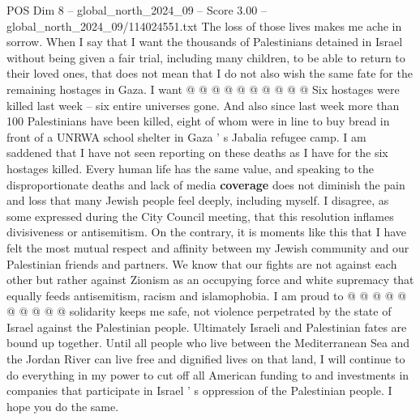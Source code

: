 \begin{textsample}{POS Dim 8 – global\_north\_2024\_09 – Score 3.00 – global\_north\_2024\_09/114024551.txt}
The loss of those lives makes me ache in sorrow.
When I say that I want the thousands of Palestinians detained in Israel without being given a fair trial, including many children, to be able to return to their loved ones, that does not mean that I do not also wish the same fate for the remaining hostages in Gaza.
I want @ @ @ @ @ @ @ @ @ @ Six hostages were killed last week -- six entire universes gone.
And also since last week more than 100 Palestinians have been killed, eight of whom were in line to buy bread in front of a UNRWA school shelter in Gaza ' s Jabalia refugee camp.
I am saddened that I have not seen reporting on these deaths as I have for the six hostages killed.
Every human life has the same value, and speaking to the disproportionate deaths and lack of media \textbf{coverage} does not diminish the pain and loss that many Jewish people feel deeply, including myself.
I disagree, as some expressed during the City Council meeting, that this resolution inflames divisiveness or antisemitism.
On the contrary, it is moments like this that I have felt the most mutual respect and affinity between my Jewish community and our Palestinian friends and partners.
We know that our fights are not against each other but rather against Zionism as an occupying force and white supremacy that equally feeds antisemitism, racism and islamophobia.
I am proud to @ @ @ @ @ @ @ @ @ @ solidarity keeps me safe, not violence perpetrated by the state of Israel against the Palestinian people.
Ultimately Israeli and Palestinian fates are bound up together.
Until all people who live between the Mediterranean Sea and the Jordan River can live free and dignified lives on that land, I will continue to do everything in my power to cut off all American funding to and investments in companies that participate in Israel ' s oppression of the Palestinian people.
I hope you do the same.

\end{textsample}

